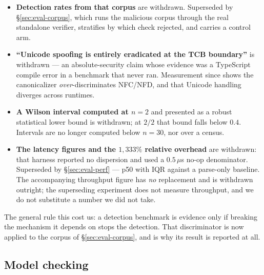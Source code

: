 \documentclass[10pt,twocolumn,letterpaper]{article}
\begin{document}
\begin{itemize}
\item \textbf{Detection rates from that corpus} are withdrawn. Superseded by
  \S\ref{sec:eval-corpus}, which runs the malicious corpus through the real
  standalone verifier, stratifies by which check rejected, and carries a
  control arm.
\item \textbf{``Unicode spoofing is entirely eradicated at the TCB
  boundary''} is withdrawn --- an absolute-security claim whose evidence was
  a TypeScript compile error in a benchmark that never ran. Measurement since
  shows the canonicalizer \emph{over}-discriminates NFC/NFD, and that Unicode
  handling diverges across runtimes.
\item \textbf{A Wilson interval computed at $n=2$} and presented as a robust
  statistical lower bound is withdrawn; at $2/2$ that bound falls below
  $0.4$. Intervals are no longer computed below $n=30$, nor over a census.
\item \textbf{The latency figures and the $1{,}333\%$ relative overhead} are
  withdrawn: that harness reported no dispersion and used a $0.5\,\mu$s no-op
  denominator. Superseded by \S\ref{sec:eval-perf} --- p50 with IQR against a
  parse-only baseline. The accompanying throughput figure has \emph{no}
  replacement and is withdrawn outright; the superseding experiment does not
  measure throughput, and we do not substitute a number we did not take.
\end{itemize}

The general rule this cost us: a detection benchmark is evidence only if
breaking the mechanism it depends on stops the detection. That discriminator
is now applied to the corpus of \S\ref{sec:eval-corpus}, and is why its
result is reported at all.

\subsection{Model checking}
\label{sec:eval-tla}
\end{document}
